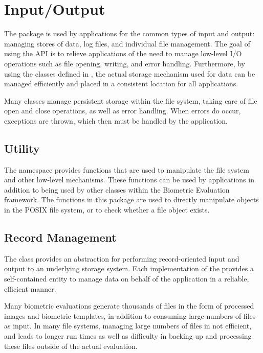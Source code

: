 %
%
\chapter{Input/Output}
\label{chp-io}

The  package is used
by applications for the common types of input and output: managing stores of
data, log files, and individual file management. The goal of using the  API 
is to relieve applications of the need to manage low-level I/O operations such
as file opening, writing, and error handling. Furthermore, by using the classes
defined in , the actual storage mechanism used for data can be managed 
efficiently and placed in a consistent location for all applications.

Many classes manage persistent storage within the file system,
taking care of file open and close operations, as well as error handling. When
errors do occur, exceptions are thrown, which then must be handled by the
application.

\section{Utility}

The  namespace provides functions that are used to
manipulate the file system and other low-level mechanisms. These functions
can be used by applications in addition to being used by other classes 
within the Biometric Evaluation framework.
The functions in this package are used to directly manipulate objects in the
POSIX file system, or to check whether a file object exists.

\section{Record Management}

The  class provides an abstraction for performing
record-oriented input and output to an underlying storage system. Each
implementation of the  provides a self-contained entity to
manage data on behalf of the application in a reliable, efficient manner.

Many biometric evaluations generate thousands of files in the form of processed
images and biometric templates, in addition to consuming large numbers of files
as input. In many file systems, managing large numbers of files in not
efficient, and leads to longer run times as well as difficulty in backing up
and processing these files outside of the actual evaluation.

